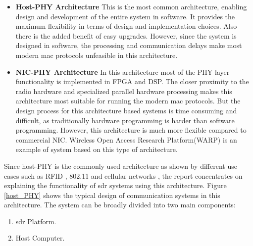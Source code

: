 \begin{itemize} 
\item{\textbf{Host-PHY Architecture} This is the most common architecture, enabling design and development of the entire system in software.
It provides the maximum flexibility in terms of design and implementation choices. Also there is the added benefit of easy upgrades.
However, since the system is designed in software, the processing and communication delays make most modern \ac{mac} protocols unfeasible in this architecture.}


\item{\textbf{NIC-PHY Architecture} In this architecture most of the \ac{PHY} layer functionality is implemented in \ac{FPGA} and \ac{DSP}.
The closer proximity to the radio hardware and specialized parallel hardware processing makes this architecture most suitable for running the modern \ac{mac} protocols.
But the design process for this architecture based systems is time consuming and difficult, as traditionally hardware programming is harder than software programming.
However, this architecture is much more flexible compared to commercial \ac{NIC}.
Wireless Open Access Research Platform(WARP) \cite{noauthor_warp_nodate} is an example of system based on this type of architecture.}

\end{itemize}
Since host-PHY \cite{nychis_enabling_nodate} is the commonly used architecture as shown by different use cases such as RFID \cite{buettner_software_2011}, 802.11 \cite{bloessl_towards_2013} and cellular networks \cite{demel_lte_2015}, the report concentrates on explaining the functionality of \ac{sdr} systems using this architecture.
Figure \ref{host_PHY} shows the typical design of communication systems in this architecture. The system can be broadly divided into two main components:
\begin{enumerate}
\item{\ac{sdr} Platform.}
\item{Host Computer.}
\end{enumerate}

